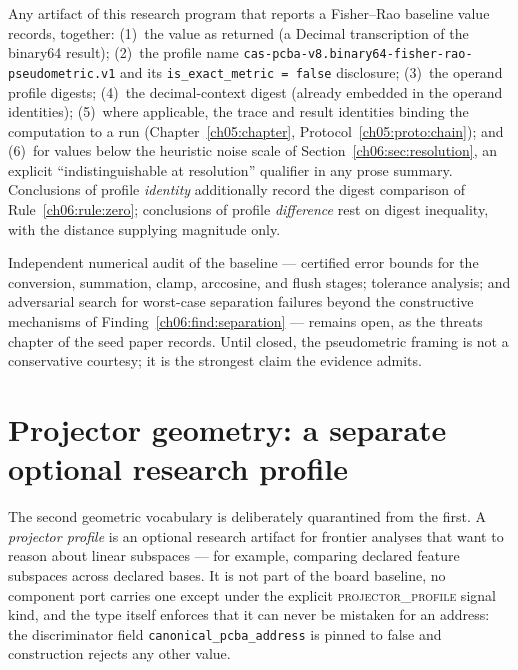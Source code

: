 \begin{protocol}
\label{ch06:proto:report}
Any artifact of this research program that reports a Fisher--Rao
baseline value records, together: (1)~the value as returned (a Decimal
transcription of the binary64 result); (2)~the profile name
\texttt{cas-pcba-v8.binary64-fisher-rao-pseudometric.v1} and its
\texttt{is\_exact\_metric = false} disclosure; (3)~the operand profile
digests; (4)~the decimal-context digest (already embedded in the
operand identities); (5)~where applicable, the trace and result
identities binding the computation to a run
(Chapter~\ref{ch05:chapter}, Protocol~\ref{ch05:proto:chain}); and
(6)~for values below the heuristic noise scale of
Section~\ref{ch06:sec:resolution}, an explicit
``indistinguishable at resolution'' qualifier in any prose summary.
Conclusions of profile \emph{identity} additionally record the digest
comparison of Rule~\ref{ch06:rule:zero}; conclusions of profile
\emph{difference} rest on digest inequality, with the distance
supplying magnitude only.
\end{protocol}

\begin{threat}\label{ch06:threat:numeric}
Independent numerical audit of the baseline --- certified error bounds
for the conversion, summation, clamp, arccosine, and flush stages;
tolerance analysis; and adversarial search for worst-case separation
failures beyond the constructive mechanisms of
Finding~\ref{ch06:find:separation} --- remains open, as the threats
chapter of the seed paper records. Until closed, the pseudometric
framing is not a conservative courtesy; it is the strongest claim the
evidence admits.
\end{threat}

\section{Projector geometry: a separate optional research profile}
\label{ch06:sec:projector}

The second geometric vocabulary is deliberately quarantined from the
first. A \emph{projector profile} is an optional research artifact for
frontier analyses that want to reason about linear subspaces --- for
example, comparing declared feature subspaces across declared bases. It
is not part of the board baseline, no component port carries one except
under the explicit \textsc{projector\_profile} signal kind, and the type
itself enforces that it can never be mistaken for an address: the
discriminator field \texttt{canonical\_pcba\_address} is pinned to false
and construction rejects any other value.

